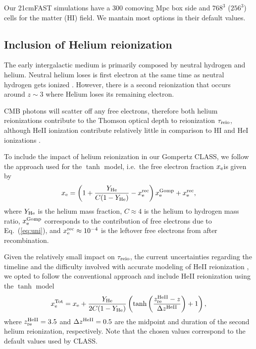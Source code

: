 Our 21cmFAST simulations have a 300 comoving Mpc box side and $768^3$
($256^3$) cells for the matter (HI) field.
We mantain most options in their default values.



\subsection*{Inclusion of Helium reionization}
\label{ssec:helium}

The early intergalactic medium is primarily composed by neutral hydrogen
and helium.
Neutral helium loses is first electron at the same time as neutral
hydrogen gets ionized \cite{Trac2007}.
However, there is a second reionization that occurs around $z\sim3$
where Helium loses its remaining electron.

CMB photons will scatter off any free electrons, therefore both helium
reionizations contribute to the Thomson optical depth to reionization
$\tau_{\mathrm{reio}}$, although HeII ionization contribute relatively little in
comparison to HI and HeI ionizations \cite{Liu2016}.

To include the impact of helium reionization in our Gompertz CLASS, we
follow the approach used for the $\tanh$ model, i.e.\ the free electron
fraction $x_{\mathrm{e}}$is given by
%
\begin{equation}
\label{eq:xe_H_He}
x_{\mathrm{e}} =  \left(1 + \frac{Y_{\mathrm{He}}}{C (1 - Y_{\mathrm{He}})} - x^{\mathrm{rec}}_{\mathrm{e}}\right) x_{\mathrm{e}}^{\mathrm{Gomp}} + x^{\mathrm{rec}}_{\mathrm{e}},
\end{equation}
%
where $Y_{\mathrm{He}}$ is the helium mass fraction, $C\approx4$ is the helium to
hydrogen mass ratio, $x_{\mathrm{e}}^{\mathrm{Gomp}}$ corresponds to the contribution of
free electrons due to Eq.~(\ref{eq:uni}), and $x^{\mathrm{rec}}_{\mathrm{e}} \approx
10^{-4}$ is the leftover free electrons from after recombination.

Given the relatively small impact on $\tau_{\mathrm{reio}}$, the current
uncertainties regarding the timeline and the difficulty involved with
accurate modeling of HeII reionization \cite{Hotinli2023,Upton2020}, we
opted to follow the conventional approach and include HeII reionization
using the $\tanh$ model
%
\begin{equation}
\label{eq:xe_tot}
x_{\mathrm{e}}^\mathrm{Tot} = x_{\mathrm{e}} + \frac{Y_{\mathrm{He}}}{2C(1 - Y_{\mathrm{He}})} \left(\tanh{\left(\frac{z_{\mathrm{re}}^{\mathrm{HeII}}- z}{\Delta z^{\mathrm{HeII}}}\right)} + 1\right),
\end{equation}
%
where $z_{\mathrm{re}}^{\mathrm{HeII}} = 3.5$ and $\Delta z^{\mathrm{HeII}} = 0.5$ are the midpoint
and duration of the second helium reionization, respectively.
Note that the chosen values correspond to the default values used by
CLASS.

